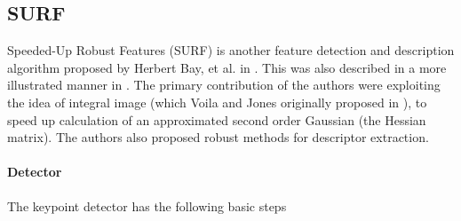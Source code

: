 
\subsection{SURF}

Speeded-Up Robust Features (SURF) is another feature detection and description algorithm proposed by Herbert Bay, et al. in \cite{surf-original-bay}. This was also described in a more illustrated manner in \cite{surf-detailed-article-bay}. The primary contribution of the authors were exploiting the idea of integral image (which Voila and Jones originally proposed in \cite{voila-jones-cascade}), to speed up calculation of an approximated second order Gaussian (the Hessian matrix). The authors also proposed robust methods for descriptor extraction.

\paragraph*{Detector}

The keypoint detector has the following basic steps

